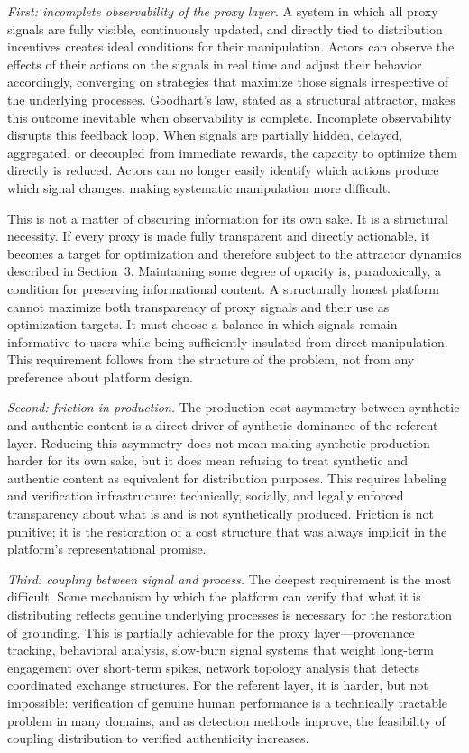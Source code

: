 \documentclass[12pt, a4paper]{article}
\begin{document}
\textit{First: incomplete observability of the proxy layer.} A system in which all proxy signals are fully visible, continuously updated, and directly tied to distribution incentives creates ideal conditions for their manipulation. Actors can observe the effects of their actions on the signals in real time and adjust their behavior accordingly, converging on strategies that maximize those signals irrespective of the underlying processes. Goodhart's law, stated as a structural attractor, makes this outcome inevitable when observability is complete. Incomplete observability disrupts this feedback loop. When signals are partially hidden, delayed, aggregated, or decoupled from immediate rewards, the capacity to optimize them directly is reduced. Actors can no longer easily identify which actions produce which signal changes, making systematic manipulation more difficult.

This is not a matter of obscuring information for its own sake. It is a structural necessity. If every proxy is made fully transparent and directly actionable, it becomes a target for optimization and therefore subject to the attractor dynamics described in Section~3. Maintaining some degree of opacity is, paradoxically, a condition for preserving informational content. A structurally honest platform cannot maximize both transparency of proxy signals and their use as optimization targets. It must choose a balance in which signals remain informative to users while being sufficiently insulated from direct manipulation. This requirement follows from the structure of the problem, not from any preference about platform design.

\textit{Second: friction in production.} The production cost asymmetry between synthetic and authentic content is a direct driver of synthetic dominance of the referent layer. Reducing this asymmetry does not mean making synthetic production harder for its own sake, but it does mean refusing to treat synthetic and authentic content as equivalent for distribution purposes. This requires labeling and verification infrastructure: technically, socially, and legally enforced transparency about what is and is not synthetically produced. Friction is not punitive; it is the restoration of a cost structure that was always implicit in the platform's representational promise.

\textit{Third: coupling between signal and process.} The deepest requirement is the most difficult. Some mechanism by which the platform can verify that what it is distributing reflects genuine underlying processes is necessary for the restoration of grounding. This is partially achievable for the proxy layer---provenance tracking, behavioral analysis, slow-burn signal systems that weight long-term engagement over short-term spikes, network topology analysis that detects coordinated exchange structures. For the referent layer, it is harder, but not impossible: verification of genuine human performance is a technically tractable problem in many domains, and as detection methods improve, the feasibility of coupling distribution to verified authenticity increases.
\end{document}
